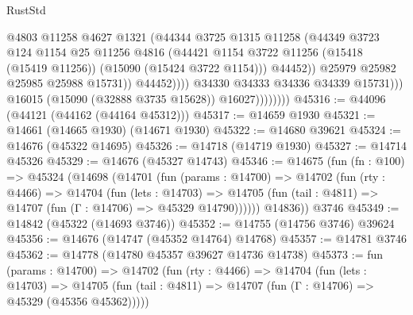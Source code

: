 \begin{lexlean}{RustStd}
\begin{coremodule}
                                      @4803
                                      @11258
                                      @4627
                                      @1321
                                      (@44344
                                        @3725
                                        @1315
                                        @11258
                                        (@44349
                                          @3723
                                          @124
                                          @1154
                                          @25
                                          @11256
                                          @4816
                                          (@44421
                                            @1154
                                            @3722
                                            @11256
                                            (@15418 (@15419 @11256))
                                            (@15090 (@15424 @3722 @1154)))
                                          @44452))
                                      @25979
                                      @25982
                                      @25985
                                      @25988
                                      @15731))
                                  @44452))))
                          @34330
                          @34333
                          @34336
                          @34339
                          @15731)))
                    @16015
                    (@15090 (@32888 @3735 @15628))
                    @16027))))))))
@45316 := @44096 (@44121 (@44162 (@44164 @45312)))
@45317 := @14659 @1930
@45321 := @14661 (@14665 @1930) (@14671 @1930)
@45322 := @14680 @39621
@45324 := @14676 (@45322 @14695)
@45326 := @14718 (@14719 @1930)
@45327 := @14714 @45326
@45329 := @14676 (@45327 @14743)
@45346 := @14675
    (fun (fn : @100) =>
    @45324
      (@14698
        (@14701
          (fun (params : @14700) =>
          @14702
            (fun (rty : @4466) =>
            @14704
              (fun (lets : @14703) =>
              @14705 (fun (tail : @4811) => @14707 (fun (Γ : @14706) => @45329 @14790))))))
        @14836))
    @3746
@45349 := @14842 (@45322 (@14693 @3746))
@45352 := @14755 (@14756 @3746) @39624
@45356 := @14676 (@14747 (@45352 @14764) @14768)
@45357 := @14781 @3746
@45362 := @14778 (@14780 @45357 @39627 @14736 @14738)
@45373 := fun (params : @14700) =>
  @14702
    (fun (rty : @4466) =>
    @14704
      (fun (lets : @14703) =>
      @14705 (fun (tail : @4811) => @14707 (fun (Γ : @14706) => @45329 (@45356 @45362)))))

\end{coremodule}
\end{lexlean}
